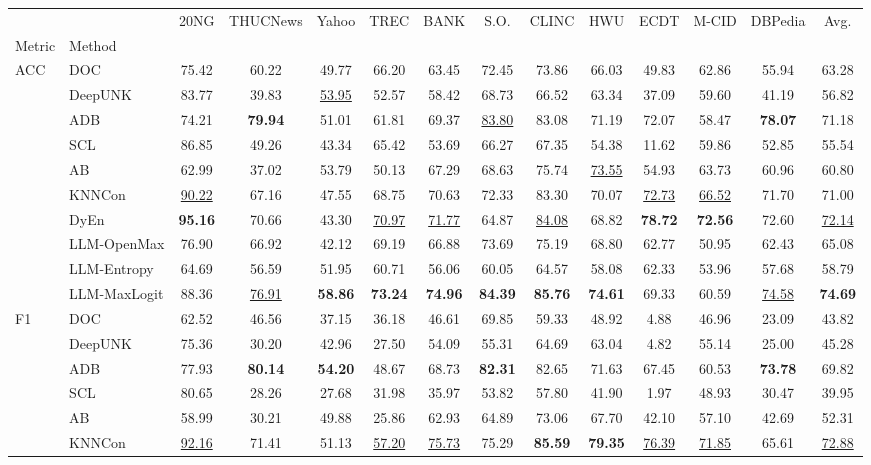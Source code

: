 \begin{tabular}{llcccccccccccc}
\toprule
&&20NG&THUCNews&Yahoo&TREC&BANK&S.O.&CLINC&HWU&ECDT&M-CID&DBPedia&Avg.\\
Metric&Method&&&&&&&&&&&&\\
\midrule
\multirow[t]{10}{*}{ACC}&DOC&75.42&60.22&49.77&66.20&63.45&72.45&73.86&66.03&49.83&62.86&55.94&63.28\\
&DeepUNK&83.77&39.83&\underline{53.95}&52.57&58.42&68.73&66.52&63.34&37.09&59.60&41.19&56.82\\
&ADB&74.21&\textbf{79.94}&51.01&61.81&69.37&\underline{83.80}&83.08&71.19&72.07&58.47&\textbf{78.07}&71.18\\
&SCL&86.85&49.26&43.34&65.42&53.69&66.27&67.35&54.38&11.62&59.86&52.85&55.54\\
&AB&62.99&37.02&53.79&50.13&67.29&68.63&75.74&\underline{73.55}&54.93&63.73&60.96&60.80\\
&KNNCon&\underline{90.22}&67.16&47.55&68.75&70.63&72.33&83.30&70.07&\underline{72.73}&\underline{66.52}&71.70&71.00\\
&DyEn&\textbf{95.16}&70.66&43.30&\underline{70.97}&\underline{71.77}&64.87&\underline{84.08}&68.82&\textbf{78.72}&\textbf{72.56}&72.60&\underline{72.14}\\
&LLM-OpenMax&76.90&66.92&42.12&69.19&66.88&73.69&75.19&68.80&62.77&50.95&62.43&65.08\\
&LLM-Entropy&64.69&56.59&51.95&60.71&56.06&60.05&64.57&58.08&62.33&53.96&57.68&58.79\\
&LLM-MaxLogit&88.36&\underline{76.91}&\textbf{58.86}&\textbf{73.24}&\textbf{74.96}&\textbf{84.39}&\textbf{85.76}&\textbf{74.61}&69.33&60.59&\underline{74.58}&\textbf{74.69}\\
\cline{1-14}
\multirow[t]{10}{*}{F1}&DOC&62.52&46.56&37.15&36.18&46.61&69.85&59.33&48.92&4.88&46.96&23.09&43.82\\
&DeepUNK&75.36&30.20&42.96&27.50&54.09&55.31&64.69&63.04&4.82&55.14&25.00&45.28\\
&ADB&77.93&\textbf{80.14}&\textbf{54.20}&48.67&68.73&\textbf{82.31}&82.65&71.63&67.45&60.53&\textbf{73.78}&69.82\\
&SCL&80.65&28.26&27.68&31.98&35.97&53.82&57.80&41.90&1.97&48.93&30.47&39.95\\
&AB&58.99&30.21&49.88&25.86&62.93&64.89&73.06&67.70&42.10&57.10&42.69&52.31\\
&KNNCon&\underline{92.16}&71.41&51.13&\underline{57.20}&\underline{75.73}&75.29&\textbf{85.59}&\textbf{79.35}&\underline{76.39}&\underline{71.85}&65.61&\underline{72.88}\\

\end{tabular}

